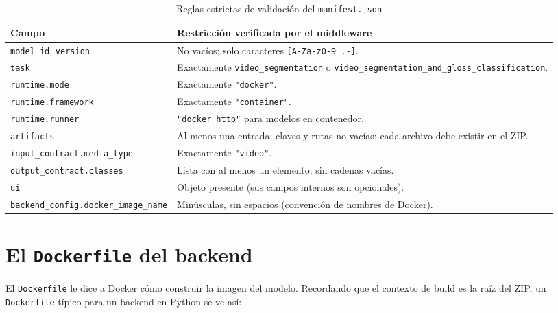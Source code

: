 \documentclass[12pt,a4paper]{article}
\begin{document}
\begin{table}[H]
\centering
\caption{Reglas estrictas de validación del \texttt{manifest.json}}
\small
\begin{tabular}{
    >{\raggedright\arraybackslash}p{5.2cm}
    >{\raggedright\arraybackslash}p{9.3cm}
}
\toprule
\textbf{Campo} & \textbf{Restricción verificada por el middleware} \\
\midrule
\texttt{model\_id}, \texttt{version} & No vacíos; solo caracteres \texttt{[A-Za-z0-9\_.-]}. \\
\texttt{task} & Exactamente \texttt{video\_segmentation} o \texttt{video\_segmentation\_and\_gloss\_classification}. \\
\texttt{runtime.mode} & Exactamente \texttt{"docker"}. \\
\texttt{runtime.framework} & Exactamente \texttt{"container"}. \\
\texttt{runtime.runner} & \texttt{"docker\_http"} para modelos en contenedor. \\
\texttt{artifacts} & Al menos una entrada; claves y rutas no vacías; cada archivo debe existir en el ZIP. \\
\texttt{input\_contract.media\_type} & Exactamente \texttt{"video"}. \\
\texttt{output\_contract.classes} & Lista con al menos un elemento; sin cadenas vacías. \\
\texttt{ui} & Objeto presente (sus campos internos son opcionales). \\
\texttt{backend\_config.docker\_image\_name} & Minúsculas, sin espacios (convención de nombres de Docker). \\
\bottomrule
\end{tabular}
\end{table}

\section{El \texttt{Dockerfile} del backend}

El \texttt{Dockerfile} le dice a Docker cómo construir la imagen del modelo. Recordando que el contexto de build es la raíz del ZIP, un \texttt{Dockerfile} típico para un backend en Python se ve así:
\end{document}
